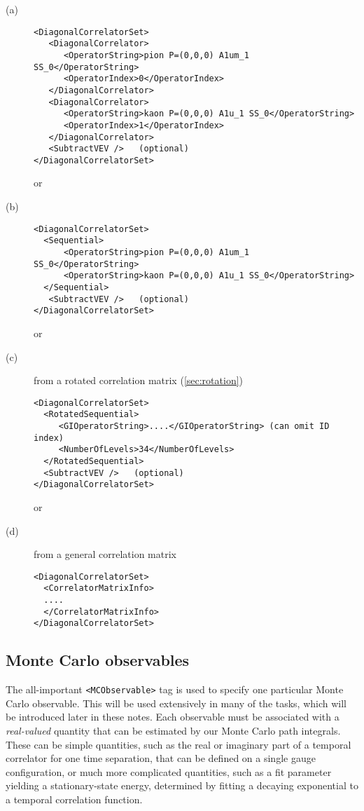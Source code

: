 \documentclass[12pt]{article}
\newcommand{\vb}{\texttt}
\begin{document}
\begin{description}
\item[(a)]
\begin{verbatim}
<DiagonalCorrelatorSet>
   <DiagonalCorrelator>
      <OperatorString>pion P=(0,0,0) A1um_1 SS_0</OperatorString>
      <OperatorIndex>0</OperatorIndex>
   </DiagonalCorrelator>
   <DiagonalCorrelator>
      <OperatorString>kaon P=(0,0,0) A1u_1 SS_0</OperatorString>
      <OperatorIndex>1</OperatorIndex>
   </DiagonalCorrelator>
   <SubtractVEV />   (optional)
</DiagonalCorrelatorSet>
\end{verbatim}
or
\item[(b)]
\begin{verbatim}
<DiagonalCorrelatorSet>
  <Sequential>
      <OperatorString>pion P=(0,0,0) A1um_1 SS_0</OperatorString>
      <OperatorString>kaon P=(0,0,0) A1u_1 SS_0</OperatorString>
  </Sequential>
   <SubtractVEV />   (optional)
</DiagonalCorrelatorSet>
\end{verbatim}
or
\item[(c)] from a rotated correlation matrix (\ref{sec:rotation})
\begin{verbatim}
<DiagonalCorrelatorSet>
  <RotatedSequential>
     <GIOperatorString>....</GIOperatorString> (can omit ID index)
     <NumberOfLevels>34</NumberOfLevels>
  </RotatedSequential>
  <SubtractVEV />   (optional)
</DiagonalCorrelatorSet>
\end{verbatim}
or
\item[(d)] from a general correlation matrix
\begin{verbatim}
<DiagonalCorrelatorSet>
  <CorrelatorMatrixInfo>
  ....
  </CorrelatorMatrixInfo>
</DiagonalCorrelatorSet>
\end{verbatim}
\end{description}

\subsection{Monte Carlo observables} \label{sec:mcobs}

The all-important \vb{<MCObservable>} tag is used to specify one particular
Monte Carlo observable. This will be used extensively in many
of the tasks, which will be introduced later in these notes.
Each observable must be associated with a \textit{real-valued}
quantity that can be estimated by our Monte Carlo path integrals.
These can be simple quantities, such as the real or imaginary part of
a temporal correlator for one time separation, that can be
defined on a single gauge configuration, or much more
complicated quantities, such as a fit parameter yielding a
stationary-state energy, determined by fitting a decaying
exponential to a temporal correlation function.\\
\end{document}
